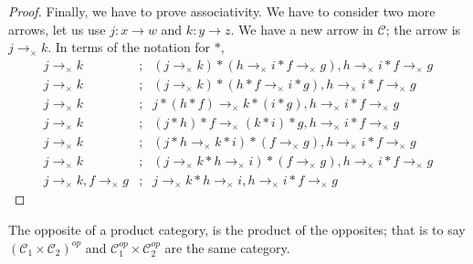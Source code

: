 \documentclass [12pt]{book}
\begin{document}
\begin{proof}
Finally, we have to prove associativity. We have to consider two more arrows, let us use $j:x\rightarrow w$ and $k:y\rightarrow z$. We have a new arrow in $\mathcal C$; the arrow is $j\rightarrow_\times k$. In terms of the notation for $*$,\begin{eqnarray}\nonumber j\rightarrow_\times k&;&(j\rightarrow_\times k)*(h\rightarrow_\times i*f\rightarrow_\times g),h\rightarrow_\times i*f\rightarrow_\times g\\\nonumber j\rightarrow_\times k&;&(j\rightarrow_\times k)*(h*f\rightarrow_\times i*g),h\rightarrow_\times i*f\rightarrow_\times g\\\nonumber j\rightarrow_\times k&;&j*(h*f)\rightarrow_\times k*(i*g),h\rightarrow_\times i*f\rightarrow_\times g\\\nonumber j\rightarrow_\times k&;&(j*h)*f\rightarrow_\times(k*i)*g,h\rightarrow_\times i*f\rightarrow_\times g\\\nonumber j\rightarrow_\times k&;&(j*h\rightarrow_\times k*i)*(f\rightarrow_\times g),h\rightarrow_\times i*f\rightarrow_\times g\\\nonumber j\rightarrow_\times k&;&(j\rightarrow_\times k*h\rightarrow_\times i)*(f\rightarrow_\times g),h\rightarrow_\times i*f\rightarrow_\times g\\\nonumber j\rightarrow_\times k,f\rightarrow_\times g&;&j\rightarrow_\times k*h\rightarrow_\times i,h\rightarrow_\times i*f\rightarrow_\times g\end{eqnarray}\end{proof}

\begin{proposition}The opposite of a product category, is the product of the opposites; that is to say $(\mathcal C_1\times\mathcal C_2)^{op}$ and $\mathcal C_1^{op}\times\mathcal C_2^{op}$ are the same category.\end{proposition}
\end{document}
